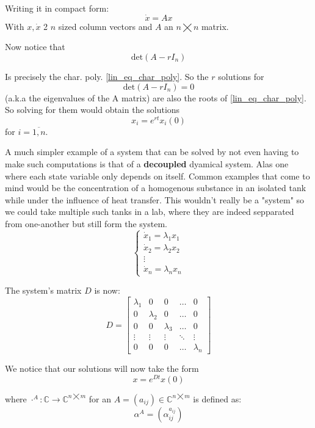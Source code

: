 Writing it in compact form:
\[
	\dot{x} = A x
\]
With $x, \dot{x}$ 2 $n$ sized column vectors and $A$ an $n \bigtimes n$ matrix.

Now notice that
\[
	\text{det}(A- r I_n)
\]

Is precisely the char. poly. \ref{lin_eq_char_poly}. So the $r$ solutions for
\[
	\text{det}(A - r I_n) =0
\]
(a.k.a the eigenvalues of the A matrix) are also the roots of \ref{lin_eq_char_poly}. So solving for them would obtain the solutions
\[
	x_i = e^{rt}x_i(0)
\]
for $i = \overline{1,n}$.

A much simpler example of a system that can be solved by not even having to make such computations is that of a \textbf{decoupled} dyamical system. Alas one where each state variable only depends on itself. Common examples that come to mind would be the concentration of a homogenous substance in an isolated tank while under the influence of heat transfer. This wouldn't really be a "system" so we could take multiple such tanks in a lab, where they are indeed sepparated from one-another but still form the system.
\begin{equation*}
	\begin{cases}
		\dot{x}_1 = \lambda_1 x_1 \\
		\dot{x}_2 = \lambda_2 x_2 \\
		\vdots                    \\
		\dot{x}_n = \lambda_n x_n
	\end{cases}
\end{equation*}

The system's matrix $D$ is now:
\begin{equation*}
	D =
	\begin{bmatrix}
		\lambda_1 & 0         & 0         & \dots  & 0         \\
		0         & \lambda_2 & 0         & \dots  & 0         \\
		0         & 0         & \lambda_3 & \dots  & 0         \\
		\vdots    & \vdots    & \vdots    & \ddots & \vdots    \\
		0         & 0         & 0         & \dots  & \lambda_n
	\end{bmatrix}
\end{equation*}

We notice that our solutions will now take the form
\[
	x = e^{Dt}x(0)
\]

where $\cdot^A : \mathbb{C} \rightarrow \mathbb{C}^{n \bigtimes m}$ for an $A = (a_{ij}) \in \mathbb{C}^{n \bigtimes m}$ is defined as:
\[
	\alpha^A = (\alpha^{a_{ij}}_{ij})
\]

